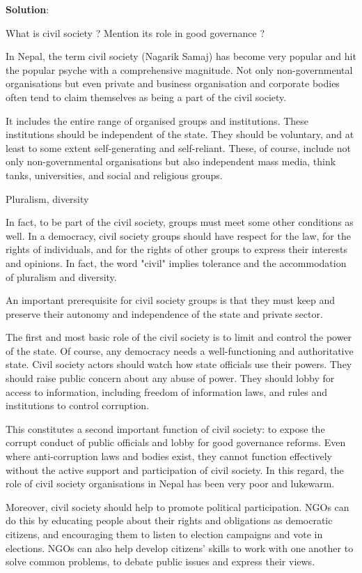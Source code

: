 \documentclass[
  openany]{book}
\newcommand{\question}{\item}
\newenvironment{solution}{ {\bfseries Solution}:}{}
\begin{document}
\begin{questions}
\begin{solution}
\end{solution}

\question What is civil society ? Mention its role in good governance ?

In Nepal, the term civil society (Nagarik Samaj) has become very popular and hit the popular psyche with a comprehensive magnitude. Not only non-governmental organisations but even private and business organisation and corporate bodies often tend to claim themselves as being a part of the civil society.

It includes the entire range of organised groups and institutions. These institutions should be independent of the state. They should be voluntary, and at least to some extent self-generating and self-reliant. These, of course, include not only non-governmental organisations but also independent mass media, think tanks, universities, and social and religious groups.

Pluralism, diversity

In fact, to be part of the civil society, groups must meet some other conditions as well. In a democracy, civil society groups should have respect for the law, for the rights of individuals, and for the rights of other groups to express their interests and opinions.  In fact, the word "civil" implies tolerance and the accommodation of pluralism and diversity.

An important prerequisite for civil society groups is that they must keep and preserve their autonomy and independence of the state and private sector.

The first and most basic role of the civil society is to limit and control the power of the state. Of course, any democracy needs a well-functioning and authoritative state. Civil society actors should watch how state officials use their powers. They should raise public concern about any abuse of power. They should lobby for access to information, including freedom of information laws, and rules and institutions to control corruption.            

This constitutes a second important function of civil society:  to expose the corrupt conduct of public officials and lobby for good governance reforms. Even where anti-corruption laws and bodies exist, they cannot function effectively without the active support and participation of civil society. In this regard, the role of civil society organisations in Nepal has been very poor and lukewarm.

Moreover, civil society should help to promote political participation. NGOs can do this by educating people about their rights and obligations as democratic citizens, and encouraging them to listen to election campaigns and vote in elections. NGOs can also help develop citizens' skills to work with one another to solve common problems, to debate public issues and express their views.


\end{questions}
\end{document}
